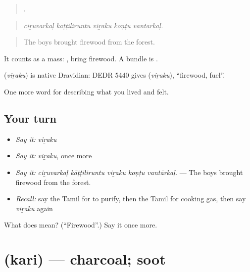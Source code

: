 \begin{quote}
    .
\end{quote}

\begin{quote}
\emph{ciṟuvarkaḷ kāṭṭiliruntu viṟaku koṇṭu vantārkaḷ.}
\end{quote}

\begin{quote}
The boys brought firewood from the forest.
\end{quote}

It counts as a mass:   , bring firewood. A bundle is  .

\begin{cousinweb}
\textbf{} (\emph{viṟaku}) is native Dravidian: DEDR 5440 gives  (\emph{viṟaku}), \textquotedblleft{}firewood, fuel\textquotedblright{}.
\end{cousinweb}

\begin{grammarlens}[title={What you've built}]
One more word for describing what you lived and felt.
\end{grammarlens}

\subsection*{Your turn}
\begin{itemize}
\raggedright
  \item \emph{Say it:} \emph{viṟaku}
  \item \emph{Say it:} \emph{viṟaku}, once more
  \item \emph{Say it:} \emph{ciṟuvarkaḷ kāṭṭiliruntu viṟaku koṇṭu vantārkaḷ.} — The boys brought firewood from the forest.
  \item \emph{Recall:} say the Tamil for to purify, then the Tamil for cooking gas, then say \emph{viṟaku} again
\end{itemize}

\begin{tcolorbox}[breakable,colback=teal!4,colframe=teal!35!black,title={Before you move on}]
What does  mean? (\textquotedblleft{}Firewood\textquotedblright{}.) Say it once more.
\end{tcolorbox}
\section[\texorpdfstring{\ta{கரி} (kari)}{கரி (kari)}]{ (kari) — charcoal; soot}

